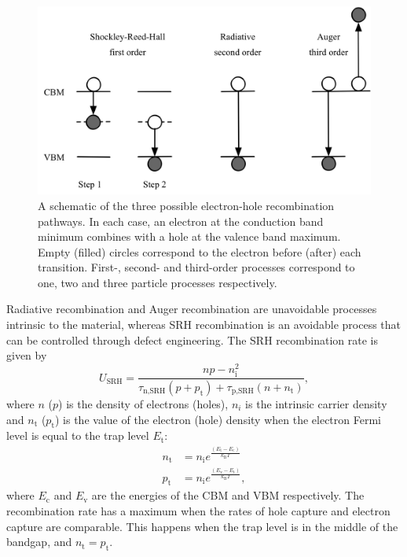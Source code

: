 \begin{figure}[h]
 \centering
   \includegraphics[width=0.65\columnwidth]{figures/ch1/recombination.png}
   \caption[Electron-hole recombination pathways]{A schematic of the three possible electron-hole recombination pathways. In each case, an electron at the conduction band minimum combines with a hole at the valence band maximum. Empty (filled) circles correspond to the electron before (after) each transition. First-, second- and third-order processes correspond to one, two and three particle processes respectively.}
   \label{recombination_processes}
 \end{figure}

Radiative recombination and Auger recombination are unavoidable processes intrinsic to the material, whereas SRH recombination is an avoidable process that can be controlled through defect engineering. The SRH recombination rate is given by
\begin{equation}
U_\textrm{SRH} = \frac{np-n_\textrm{i}^2}{\tau_\textrm{n,SRH}(p+p_\textrm{t})+\tau_\textrm{p,SRH}(n+n_\textrm{t})},
\end{equation}
where $n$ ($p$) is the density of electrons (holes), $n_i$ is the intrinsic carrier density and $n_\mathrm{t}$ ($p_\mathrm{t}$) is the value of the electron (hole) density when the electron Fermi level is equal to the trap level $E_\mathrm{t}$: 
\begin{align}
n_\mathrm{t} &= n_\mathrm{i}e^{\frac{(E_\mathrm{t}-E_\mathrm{c})}{k_\mathrm{B}T}} \\
p_\mathrm{t} &= n_\mathrm{i}e^{\frac{(E_\mathrm{v}-E_\mathrm{t})}{k_\mathrm{B}T}},
\end{align}
where $E_\mathrm{c}$ and $E_\mathrm{v}$ are the energies of the CBM and VBM respectively. The recombination rate has a maximum when the rates of hole capture and electron capture are comparable. This happens when the trap level is in the middle of the bandgap, and $n_\mathrm{t} = p_\mathrm{t}$. %

